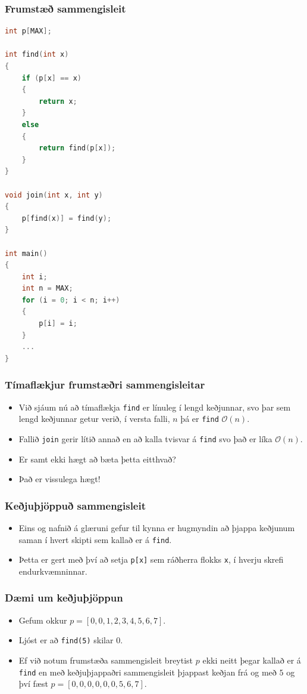 \documentclass{beamer}
\begin{document}
\begin{frame}[fragile]
	\frametitle{Frumstæð sammengisleit}
\tiny
\begin{lstlisting}[language=C++]
int p[MAX];

int find(int x)
{
	if (p[x] == x)
	{
		return x;
	}
	else
	{
		return find(p[x]);
	}
}

void join(int x, int y)
{
	p[find(x)] = find(y);
}

int main()
{
	int i;
	int n = MAX;
	for (i = 0; i < n; i++)
	{
		p[i] = i;
	}
	...
}
\end{lstlisting}
\end{frame}

\begin{frame}
\frametitle{Tímaflækjur frumstæðri sammengisleitar}
\begin{itemize}
	\item<1-> Við sjáum nú að tímaflækja \texttt{find} er línuleg í lengd keðjunnar, svo 
		þar sem lengd keðjunnar getur verið, í versta falli, $n$ þá er \texttt{find} $\mathcal{O}(n)$.
	\item<2-> Fallið \texttt{join} gerir lítið annað en að kalla tvisvar á \texttt{find} svo það er líka
		$\mathcal{O}(n)$.
	\item<3-> Er samt ekki hægt að bæta þetta eitthvað?
	\item<4-> Það er vissulega hægt!
\end{itemize}
\end{frame}

\begin{frame}
\frametitle{Keðjuþjöppuð sammengisleit}
\begin{itemize}
	\item<1-> Eins og nafnið á glæruni gefur til kynna er hugmyndin að þjappa keðjunum saman í hvert skipti sem kallað er á
		\texttt{find}.
	\item<2-> Þetta er gert með því að setja \texttt{p[x]} sem ráðherra flokks \texttt{x}, í hverju skrefi endurkvæmninnar.
\end{itemize}
\end{frame}

\begin{frame}
\frametitle{Dæmi um keðjuþjöppun}
\begin{itemize}
	\item<1-> Gefum okkur
		$p = [0, 0, 1, 2, 3, 4, 5, 6, 7]$.
	\item<2-> Ljóst er að \texttt{find(5)} skilar $0$.
	\item<3-> Ef við notum frumstæða sammengisleit breytist $p$ ekki neitt þegar kallað er á \texttt{find}
		en með keðjuþjappaðri sammengisleit þjappast keðjan frá og með $5$ og því fæst
		$p = [0, 0, 0, 0, 0, 0, 5, 6, 7]$.
\end{itemize}
\end{frame}
\end{document}
